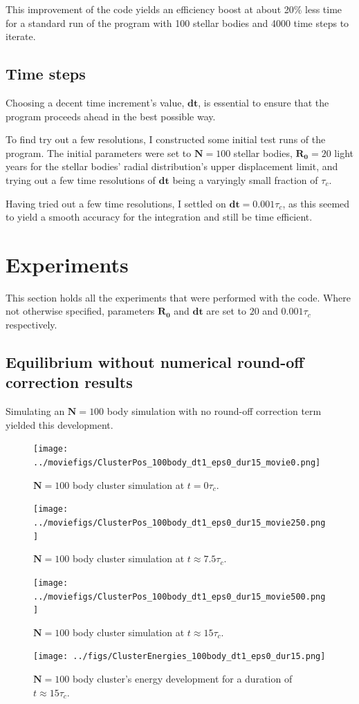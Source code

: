 \documentclass[11pt,a4paper,notitlepage,twocolumn]{article}
\begin{document}
This improvement of the code yields an efficiency boost at about 20\% less time for a standard run of the program with 100 stellar bodies and 4000 time steps to iterate.

\subsection{Time steps}
Choosing a decent time increment's value, $\mathbf{dt}$, is essential to ensure that the program proceeds ahead in the best possible way.

To find try out a few resolutions, I constructed some initial test runs of the program. The initial parameters were set to $\mathbf{N} = 100$ stellar bodies, $\mathbf{R_0} = 20$ light years for the stellar bodies' radial distribution's upper displacement limit, and trying out a few time resolutions of $\mathbf{dt}$ being a varyingly small fraction of $\tau_c$.

Having tried out a few time resolutions, I settled on $\mathbf{dt} = 0.001\tau_c$, as this seemed to yield a smooth accuracy for the integration and still be time efficient.

\section{Experiments}
This section holds all the experiments that were performed with the code. Where not otherwise specified, parameters $\mathbf{R_0}$ and $\mathbf{dt}$ are set to $20$ and $0.001\tau_c$ respectively.
\subsection{Equilibrium without numerical round-off correction results}
Simulating an $\mathbf{N} = 100$ body simulation with no round-off correction term yielded this development.
\begin{figure}
[H]\center
\texttt{[image: ../moviefigs/ClusterPos\_100body\_dt1\_eps0\_dur15\_movie0.png]}
\caption{$\mathbf{N} = 100$ body cluster simulation at $t = 0\tau_c$.}
\end{figure}
\begin{figure}
[H]\center
\texttt{[image: ../moviefigs/ClusterPos\_100body\_dt1\_eps0\_dur15\_movie250.png]}
\caption{$\mathbf{N} = 100$ body cluster simulation at $t \approx 7.5\tau_c$.}
\end{figure}
\begin{figure}
[H]\center
\texttt{[image: ../moviefigs/ClusterPos\_100body\_dt1\_eps0\_dur15\_movie500.png]}
\caption{$\mathbf{N} = 100$ body cluster simulation at $t \approx 15\tau_c$.}
\end{figure}
\begin{figure}
[H]\center
\texttt{[image: ../figs/ClusterEnergies\_100body\_dt1\_eps0\_dur15.png]}
\caption{$\mathbf{N} = 100$ body cluster's energy development for a duration of $t \approx 15\tau_c$.}\label{fig:eps0dur15}
\end{figure}
\end{document}

